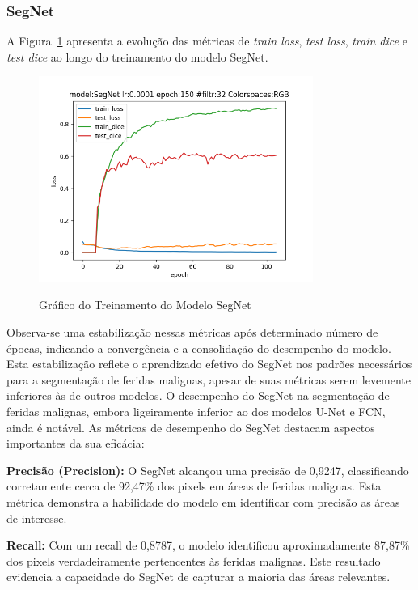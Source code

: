 \subsubsection{SegNet}

A Figura~\ref{fig:graphSegNet} apresenta a evolução das métricas de \textit{train loss}, \textit{test loss}, \textit{train dice} e \textit{test dice} ao longo do treinamento do modelo \ac{SegNet}. 

\begin{figure}[htbp]
    \centering
    \caption{Gráfico do Treinamento do Modelo \acf{SegNet}}
    \includegraphics[width=0.8\textwidth]{img/segnetprunedmodelfile.png}
    \label{fig:graphSegNet}
\end{figure}

Observa-se uma estabilização nessas métricas após determinado número de épocas, indicando a convergência e a consolidação do desempenho do modelo. Esta estabilização reflete o aprendizado efetivo do \ac{SegNet} nos padrões necessários para a segmentação de feridas malignas, apesar de suas métricas serem levemente inferiores às de outros modelos. O desempenho do \ac{SegNet} na segmentação de feridas malignas, embora ligeiramente inferior ao dos modelos \ac{U-Net} e \ac{FCN}, ainda é notável. As métricas de desempenho do \ac{SegNet} destacam aspectos importantes da sua eficácia:

\textbf{Precisão (Precision):} O \ac{SegNet} alcançou uma precisão de 0,9247, classificando corretamente cerca de 92,47\% dos pixels em áreas de feridas malignas. Esta métrica demonstra a habilidade do modelo em identificar com precisão as áreas de interesse.

\textbf{Recall:} Com um recall de 0,8787, o modelo identificou aproximadamente 87,87\% dos pixels verdadeiramente pertencentes às feridas malignas. Este resultado evidencia a capacidade do \ac{SegNet} de capturar a maioria das áreas relevantes.


